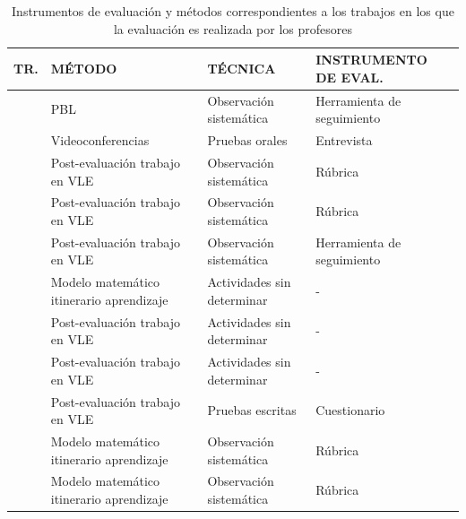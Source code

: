 \begin{table}
  \begin{center}
  \begin{tabular}{| c | m{5.5cm} | m{4.5cm} | m{3cm} |}
    \hline
    TR. & MÉTODO & TÉCNICA & INSTRUMENTO DE EVAL. \\
    \hline
    \hline
    \cite{lacuesta2009active}  & PBL & Observación sistemática & Herramienta de seguimiento \\
    \hline
    \cite{ward2011developing} & Videoconferencias & Pruebas orales & Entrevista  \\
    \hline
    \cite{martin2013acquired} & Post-evaluación trabajo en VLE & Observación sistemática  & Rúbrica \\
    \hline
    \cite{rodriguez2010portfolio} & Post-evaluación trabajo en VLE & Observación sistemática & Rúbrica  \\
    \hline
    \cite{benlloch2007adapting} & Post-evaluación trabajo en VLE & Observación sistemática & Herramienta de seguimiento \\
    \hline
    \cite{yang2014fine}  & Modelo matemático itinerario aprendizaje & Actividades sin determinar & -  \\
    \hline
    \cite{serrano2013hiperion} & Post-evaluación trabajo en VLE & Actividades sin determinar & -  \\
    \hline
    \cite{starcic2008sustaining} & Post-evaluación trabajo en VLE & Actividades sin determinar & - \\
    \hline
    \cite{vizcarro2013assessment}   & Post-evaluación trabajo en VLE & Pruebas escritas & Cuestionario \\
    \hline
    \cite{rashid2008engineering} & Modelo matemático itinerario aprendizaje & Observación sistemática & Rúbrica \\
    \hline
    \cite{aziz2007appraisal} & Modelo matemático itinerario aprendizaje & Observación sistemática & Rúbrica \\
    \hline
    \end{tabular}
\end{center}
\caption{Instrumentos de evaluación y métodos correspondientes a los trabajos en los que la evaluación es realizada por los profesores}
\label{tab:MetodosProfesor}
\end{table} 

